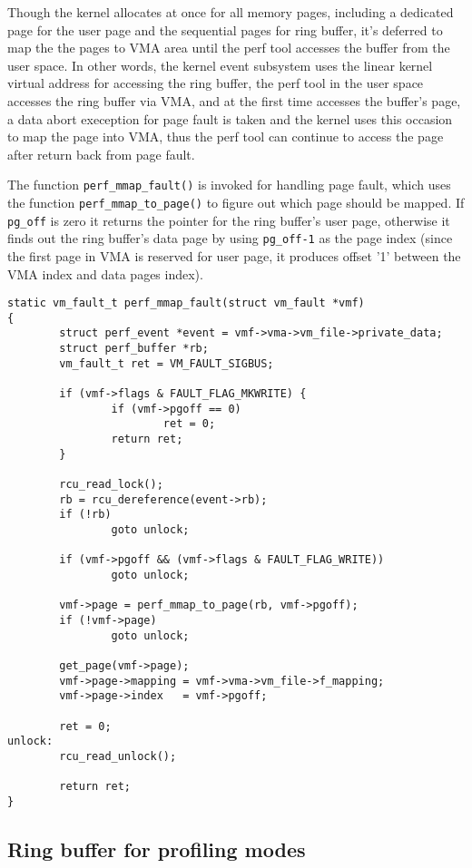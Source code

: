 \documentclass[11pt]{diazessay} %
\def\code#1{\texttt{#1}}
\begin{document}
Though the kernel allocates at once for all memory pages, including a dedicated page for the user page and the sequential pages for ring buffer, it's deferred to map the the pages to VMA area until the perf tool accesses the buffer from the user space.  In other words, the kernel event subsystem uses the linear kernel virtual address for accessing the ring buffer, the perf tool in the user space accesses the ring buffer via VMA, and at the first time accesses the buffer's page, a data abort exeception for page fault is taken and the kernel uses this occasion to map the page into VMA, thus the perf tool can continue to access the page after return back from page fault.

The function \code{perf\_mmap\_fault()} is invoked for handling page fault, which uses the function \code{perf\_mmap\_to\_page()} to figure out which page should be mapped. If \code{pg\_off} is zero it returns the pointer for the ring buffer's user page, otherwise it finds out the ring buffer's data page by using \code{pg\_off-1} as the page index (since the first page in VMA is reserved for user page, it produces offset '1' between the VMA index and data pages index).

\begin{lstlisting}
static vm_fault_t perf_mmap_fault(struct vm_fault *vmf)
{
        struct perf_event *event = vmf->vma->vm_file->private_data;
        struct perf_buffer *rb;
        vm_fault_t ret = VM_FAULT_SIGBUS;

        if (vmf->flags & FAULT_FLAG_MKWRITE) {
                if (vmf->pgoff == 0)
                        ret = 0;
                return ret;
        }

        rcu_read_lock();
        rb = rcu_dereference(event->rb);
        if (!rb)
                goto unlock;

        if (vmf->pgoff && (vmf->flags & FAULT_FLAG_WRITE))
                goto unlock;

        vmf->page = perf_mmap_to_page(rb, vmf->pgoff);
        if (!vmf->page)
                goto unlock;

        get_page(vmf->page);
        vmf->page->mapping = vmf->vma->vm_file->f_mapping;
        vmf->page->index   = vmf->pgoff;

        ret = 0;
unlock:
        rcu_read_unlock();

        return ret;
}
\end{lstlisting}

\subsection*{Ring buffer for profiling modes}
\end{document}
